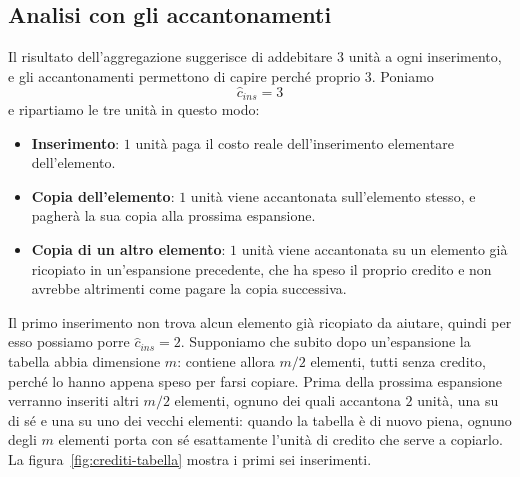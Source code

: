 \subsection{Analisi con gli accantonamenti}
Il risultato dell'aggregazione suggerisce di addebitare $3$ unità a ogni inserimento, e gli accantonamenti permettono di capire perché proprio $3$. Poniamo
\[
\hat{c}_{ins} = 3
\]
e ripartiamo le tre unità in questo modo:
\begin{itemize}
    \item \textbf{Inserimento}: $1$ unità paga il costo reale dell'inserimento elementare dell'elemento.
    \item \textbf{Copia dell'elemento}: $1$ unità viene accantonata sull'elemento stesso, e pagherà la sua copia alla prossima espansione.
    \item \textbf{Copia di un altro elemento}: $1$ unità viene accantonata su un elemento già ricopiato in un'espansione precedente, che ha speso il proprio credito e non avrebbe altrimenti come pagare la copia successiva.
\end{itemize}
Il primo inserimento non trova alcun elemento già ricopiato da aiutare, quindi per esso possiamo porre $\hat{c}_{ins} = 2$. Supponiamo che subito dopo un'espansione la tabella abbia dimensione $m$: contiene allora $m/2$ elementi, tutti senza credito, perché lo hanno appena speso per farsi copiare. Prima della prossima espansione verranno inseriti altri $m/2$ elementi, ognuno dei quali accantona $2$ unità, una su di sé e una su uno dei vecchi elementi: quando la tabella è di nuovo piena, ognuno degli $m$ elementi porta con sé esattamente l'unità di credito che serve a copiarlo. La figura~\ref{fig:crediti-tabella} mostra i primi sei inserimenti.

